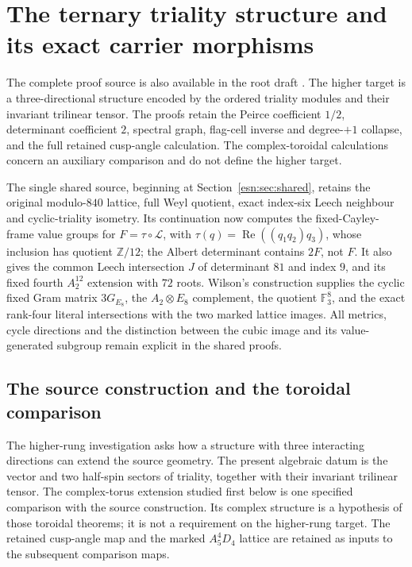 \section{The ternary triality structure and its exact carrier morphisms}
\label{sec:h24-continuation}
The complete proof source is also available in the root draft
. The higher target is a
three-directional structure encoded by the ordered triality modules and
their invariant trilinear tensor. The proofs retain the Peirce coefficient
$1/2$, determinant coefficient $2$, spectral graph, flag-cell inverse and
degree-$+1$ collapse, and the full retained cusp-angle calculation.
The complex-toroidal calculations concern an auxiliary comparison and
do not define the higher target.

The single shared source, beginning at Section~\ref{esn:sec:shared},
retains the original modulo-$840$ lattice, full Weyl quotient, exact
index-six Leech neighbour and cyclic-triality isometry. Its continuation
now computes the fixed-Cayley-frame value groups for
$F=\tau\circ\mathcal L$, with $\tau(q)=\operatorname{Re}((q_1q_2)q_3)$, whose
inclusion has quotient $\mathbb Z/12$; the Albert determinant contains
$2F$, not $F$. It also gives the common Leech intersection $J$ of
determinant $81$ and index $9$, and its fixed fourth $A_2^{12}$ extension
with $72$ roots. Wilson's construction \cite{esn:Wilson2009} supplies
the cyclic fixed Gram matrix $3G_{E_8}$, the $A_2\otimes E_8$
complement, the quotient $\mathbb F_3^8$, and the exact rank-four
literal intersections with the two marked lattice images. All metrics,
cycle directions and the distinction between the cubic image and its
value-generated subgroup remain explicit in the shared proofs.

\subsection{The source construction and the toroidal comparison}

The higher-rung investigation asks how a structure with three interacting
directions can extend the source geometry. The present algebraic datum is
the vector and two half-spin sectors of triality, together with their
invariant trilinear tensor. The complex-torus extension studied first below
is one specified comparison with the source construction. Its complex
structure is a hypothesis of those toroidal theorems; it is not a
requirement on the higher-rung target. The retained cusp-angle map and the
marked $A_5^4D_4$ lattice are retained as inputs to the subsequent comparison
maps.

